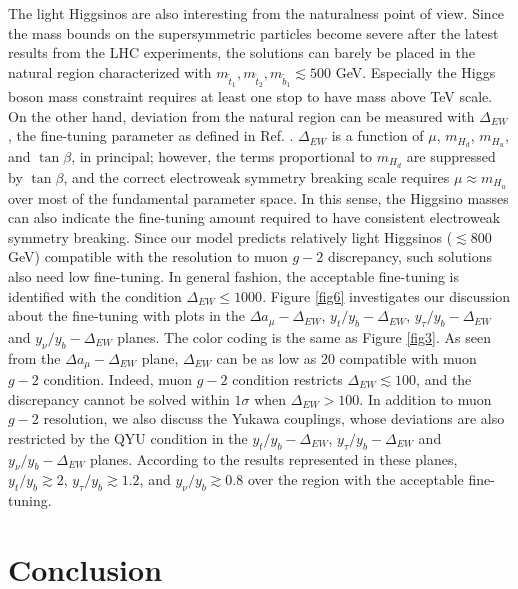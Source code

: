 \documentclass[12pt]{article}
\begin{document}
The light Higgsinos are also interesting from the naturalness point of view. Since the mass bounds on the supersymmetric particles become severe after the latest results from the LHC experiments, the solutions can barely be placed in the natural region characterized with $m_{\tilde{t}_{1}},m_{\tilde{t}_{2}}, m_{\tilde{b}_{1}} \lesssim 500$ GeV. Especially the Higgs boson mass constraint requires at least one stop to have mass above TeV scale. On the other hand, deviation from the natural region can be measured with $\Delta_{EW}$, the fine-tuning parameter as defined in Ref. \cite{Baer:2012mv}. $\Delta_{EW}$ is a function of $\mu$, $m_{H_{d}}$, $m_{H_{u}}$, and $\tan\beta$, in principal; however, the terms proportional to $m_{H_{d}}$ are suppressed by $\tan\beta$, and the correct electroweak symmetry breaking scale requires $\mu \approx m_{H_{u}}$ over most of the fundamental parameter space. In this sense, the Higgsino masses can also indicate the fine-tuning amount required to have consistent electroweak symmetry breaking. Since our model predicts relatively light Higgsinos ($\lesssim 800$ GeV) compatible with the resolution to muon $g-2$ discrepancy, such solutions also need low fine-tuning. In general fashion, the acceptable fine-tuning is identified with the condition $\Delta_{EW} \leq 1000$. Figure \ref{fig6} investigates our discussion about the fine-tuning with plots in the $\Delta a_{\mu}-\Delta_{EW}$, $y_{t}/y_{b}-\Delta_{EW}$, $y_{\tau}/y_{b}-\Delta_{EW}$ and $y_{\nu}/y_{b}-\Delta_{EW}$ planes. The color coding is the same as Figure \ref{fig3}. As seen from the  $\Delta a_{\mu}-\Delta_{EW}$ plane, $\Delta_{EW}$ can be as low as 20 compatible with muon $g-2$ condition. Indeed, muon $g-2$ condition restricts $\Delta_{EW} \lesssim 100$, and the discrepancy cannot be solved within $1\sigma$ when $\Delta_{EW} > 100$. In addition to muon $g-2$ resolution, we also discuss the Yukawa couplings, whose deviations are also restricted by the QYU condition in the $y_{t}/y_{b}-\Delta_{EW}$, $y_{\tau}/y_{b}-\Delta_{EW}$ and $y_{\nu}/y_{b}-\Delta_{EW}$ planes. According to the results represented in these planes, $y_{t}/y_{b} \gtrsim 2$, $y_{\tau}/y_{b}\gtrsim 1.2$, and $y_{\nu}/y_{b} \gtrsim 0.8$ over the region with the acceptable fine-tuning.
 






\section{Conclusion}
\label{sec:conc}
\end{document}
